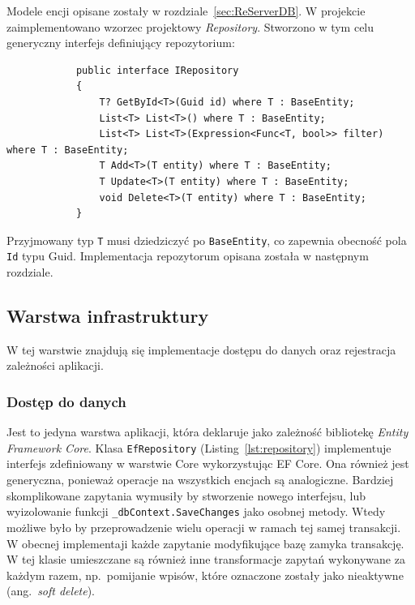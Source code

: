 		Modele encji opisane zostały w rozdziale~\ref{sec:ReServerDB}.
		W projekcie zaimplementowano wzorzec projektowy \emph{Repository}.
		Stworzono w tym celu generyczny interfejs definiujący repozytorium:
		\begin{lstlisting}
			public interface IRepository
			{
				T? GetById<T>(Guid id) where T : BaseEntity;
				List<T> List<T>() where T : BaseEntity;
				List<T> List<T>(Expression<Func<T, bool>> filter) where T : BaseEntity;
				T Add<T>(T entity) where T : BaseEntity;
				T Update<T>(T entity) where T : BaseEntity;
				void Delete<T>(T entity) where T : BaseEntity;
			}
		\end{lstlisting}
		Przyjmowany typ \verb|T| musi dziedziczyć po \verb|BaseEntity|, co zapewnia obecność pola \verb|Id| typu Guid.
		Implementacja repozytorum opisana została w następnym rozdziale.

	\subsection{Warstwa infrastruktury}\label{sec:apiInfr}
		W tej warstwie znajdują się implementacje dostępu do danych oraz rejestracja zależności aplikacji.

		\subsubsection*{Dostęp do danych}
			Jest to jedyna warstwa aplikacji, która deklaruje jako zależność bibliotekę \emph{Entity Framework Core}.
			Klasa \verb|EfRepository| (Listing~\ref{lst:repository}) implementuje interfejs zdefiniowany w warstwie Core wykorzystując EF Core.
			Ona również jest generyczna, ponieważ operacje na wszystkich encjach są analogiczne.
			Bardziej skomplikowane zapytania wymusiły by stworzenie nowego interfejsu, lub wyizolowanie funkcji \verb|_dbContext.SaveChanges| jako osobnej metody.
			Wtedy możliwe było by przeprowadzenie wielu operacji w ramach tej samej transakcji.
			W obecnej implementaji każde zapytanie modyfikujące bazę zamyka transakcję.
			W tej klasie umieszczane są również inne transformacje zapytań wykonywane za każdym razem,
			np.\ pomijanie wpisów, które oznaczone zostały jako nieaktywne (ang.\ \emph{soft delete}).

